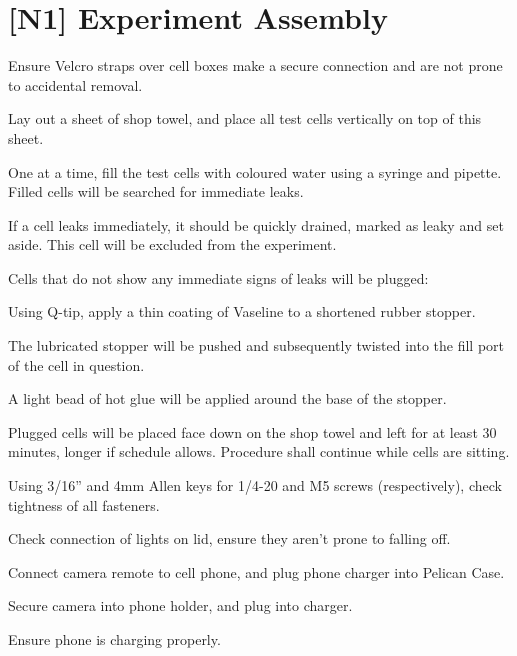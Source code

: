 \newpage
\section{[N1] Experiment Assembly}
\begin{checklist}
    \item Ensure Velcro straps over cell boxes make a secure connection and are not prone to accidental removal.
    \item Lay out a sheet of shop towel, and place all test cells vertically on top of this sheet.
    \item One at a time, fill the test cells with coloured water using a syringe and pipette. Filled cells will be searched for immediate leaks.
    \begin{checklist}
        \item If a cell leaks immediately, it should be quickly drained, marked as leaky and set aside. This cell will be excluded from the experiment.
        \item Cells that do not show any immediate signs of leaks will be plugged:
        \begin{checklist}
            \item Using Q-tip, apply a thin coating of Vaseline to a shortened rubber stopper.
            \item The lubricated stopper will be pushed and subsequently twisted into the
fill port of the cell in question.
            \item A light bead of hot glue will be applied around the base of the stopper.
        \end{checklist}
        \item Plugged cells will be placed face down on the shop towel and left for at least 30 minutes, longer if schedule allows.  Procedure shall continue while cells are sitting.
    \end{checklist}
    \item Using 3/16'' and 4mm Allen keys for 1/4-20 and M5 screws (respectively), check tightness of all fasteners.
    \item Check connection of lights on lid, ensure they aren’t prone to falling off.
    \item Connect camera remote to cell phone, and plug phone charger into Pelican Case.
    \item Secure camera into phone holder, and plug into charger.
    \begin{checklist}
        \item Ensure phone is charging properly.

\end{checklist}
\end{checklist}
